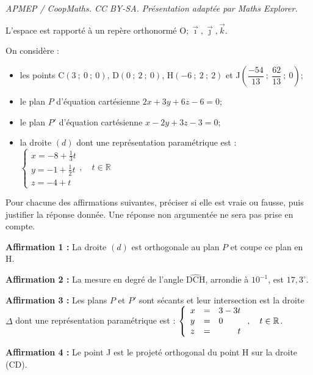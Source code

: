 \documentclass[10pt]{article}
\providecommand{\R}{\mathbb{R}}
\providecommand{\enskip}{\quad}
\providecommand{\Oijk}{\(\mathrm{O};\vec{\imath},\vec{\jmath},\vec{k}\)}
\begin{document}
\noindent\textit{APMEP / CoopMaths. CC BY-SA. Présentation adaptée par Maths Explorer.}\par\medskip
\medskip
L'espace est rapporté à un repère orthonormé \Oijk.

On considère :

\begin{itemize}
\item les points C$(3~;~0~;~0)$, D$(0~;~2~;~0)$, H$(-6~;~2~;~2)$ et J$\left(\dfrac{-54}{13}~;~\dfrac{62}{13}~;~0\right)$;
\item le plan $P$ d'équation cartésienne $2 x+3 y+ 6 z-6 = 0$;
\item le plan $P'$ d'équation cartésienne $x - 2 y + 3 z - 3 = 0$;
\item la droite $(d)$ dont une représentation paramétrique est : $\begin{cases}x=- 8+\frac{1}{3} t \\ y = -1+\frac{1}{2} t \\ z=-4+t\end{cases}, \enskip t \in \R$
\end{itemize}

Pour chacune des affirmations suivantes, préciser si elle est vraie ou fausse, puis justifier la réponse donnée. Une réponse non argumentée ne sera pas prise en compte.

\medskip

\textbf{Affirmation 1 : } La droite $(d)$ est orthogonale au plan $P$ et coupe ce plan en H.

\medskip

\textbf{Affirmation 2 : } La mesure en degré de l'angle $\widehat{\mathrm{D C H}}$, arrondie à $10^{-1}$, est $17,3^{\circ}$.

\medskip

\textbf{Affirmation 3 : } Les plans $P$ et $P'$ sont sécants et leur intersection est la droite $\Delta$ dont une représentation paramétrique est : $\left\{\begin{array}{l c l}x&=&3-3 t \\ y&=&0 \\ z&=&\phantom{3- 3}t\end{array}\right.,\enskip t \in \R$.
\medskip

\textbf{Affirmation 4 : } Le point J est le projeté orthogonal du point H sur la droite (CD).

\medskip
\end{document}
